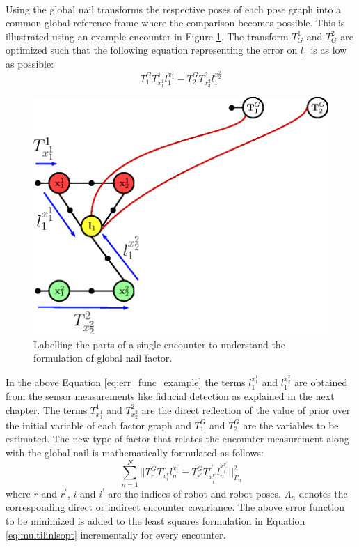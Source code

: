 \paragraph{}
Using the global nail transforms the respective poses of each pose graph into a common global reference frame where the comparison becomes possible. This is illustrated using an example encounter in Figure \ref{fig:err_func}. The transform $T_G^1$ and $T_G^2$ are optimized such that the following equation representing the error on $l_1$ is as low as possible:
\begin{equation}
T_1^GT_{x_1^1}^1l_1^{x_1^1} - T_{2}^GT_{x_{2}^{2}}^{2}l_1^{x_{2}^{2}}
\label{eq:err_func_example}
\end{equation}
\begin{figure}[H]
\centering
\includegraphics{Chapters/figures4/err_func}
\caption{Labelling the parts of a single encounter to understand the formulation of global nail factor.}
\label{fig:err_func}
\end{figure}
In the above Equation \ref{eq:err_func_example} the terms $l_1^{x_1^1}$ and $l_1^{x_{2}^{2}}$ are obtained from the sensor measurements like fiducial detection as explained in the next chapter. The terms $T_{x_1^1}^1$ and $T_{x_{2}^{2}}^{2}$ are the direct reflection of the value of prior over the initial variable of each factor graph and $T_1^G$ and $T_{2}^G$ are the variables to be estimated. The new type of factor that relates the encounter measurement along with the global nail is mathematically formulated as follows:
\begin{equation}
\sum_{n=1}^N \bigg\lvert\bigg\lvert T_r^GT_{x_i^r}^rl_n^{x_i^r} - T_{r^\prime}^GT_{x_{i^\prime}^{r^\prime}}^{r^\prime}l_n^{x_{i^\prime}^{r^\prime}}\bigg\rvert\bigg\rvert_{\Gamma_n}^2
\label{eq:err_func}
\end{equation}
where $r$ and $r^\prime$, $i$ and $i^\prime$ are the indices of robot and robot poses. $\Lambda_n$ denotes the corresponding direct or indirect encounter covariance. The above error function to be minimized is added to the least squares formulation in Equation \ref{eq:multilinlsopt} incrementally for every encounter. 
